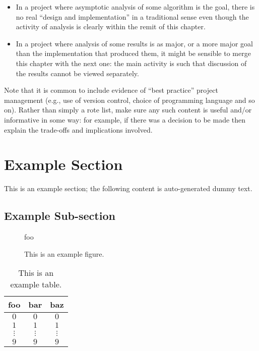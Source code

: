 \documentclass[ %
                    author={Dillon Keith Diep},
                supervisor={Dr. Carl Henrik Ek},
                    degree={MEng},
                     title={Assisted Content Generation for 3D Hair Geometry},
                  subtitle={[INCOMPLETE DRAFT, NOT FOR SUBMISSION]},
                      type={Research},
                      year={2014} ]{dissertation}
\begin{document}
\begin{itemize}
\item In a project where asymptotic analysis of some algorithm is the goal,
      there is no real ``design and implementation'' in a traditional sense
      even though the activity of analysis is clearly within the remit of
      this chapter.
\item In a project where analysis of some results is as major, or a more
      major goal than the implementation that produced them, it might be
      sensible to merge this chapter with the next one: the main activity 
      is such that discussion of the results cannot be viewed separately.
\end{itemize}

\noindent
Note that it is common to include evidence of ``best practice'' project 
management (e.g., use of version control, choice of programming language 
and so on).  Rather than simply a rote list, make sure any such content 
is useful and/or informative in some way: for example, if there was a 
decision to be made then explain the trade-offs and implications 
involved.

\section{Example Section}

This is an example section; 
the following content is auto-generated dummy text.
\lipsum

\subsection{Example Sub-section}

\begin{figure}[t]
\centering
foo
\caption{This is an example figure.}
\label{fig}
\end{figure}

\begin{table}[t]
\centering
\begin{tabular}{|cc|c|}
\hline
foo      & bar      & baz      \\
\hline
$0     $ & $0     $ & $0     $ \\
$1     $ & $1     $ & $1     $ \\
$\vdots$ & $\vdots$ & $\vdots$ \\
$9     $ & $9     $ & $9     $ \\
\hline
\end{tabular}
\caption{This is an example table.}
\label{tab}
\end{table}
\end{document}
